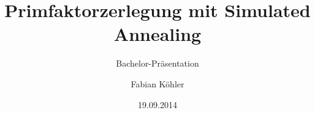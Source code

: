 

\title{Primfaktorzerlegung mit Simulated Annealing}
\subtitle{Bachelor-Präsentation}
\author{Fabian Köhler}
\date{19.09.2014}




  
  
  
  
  
  

